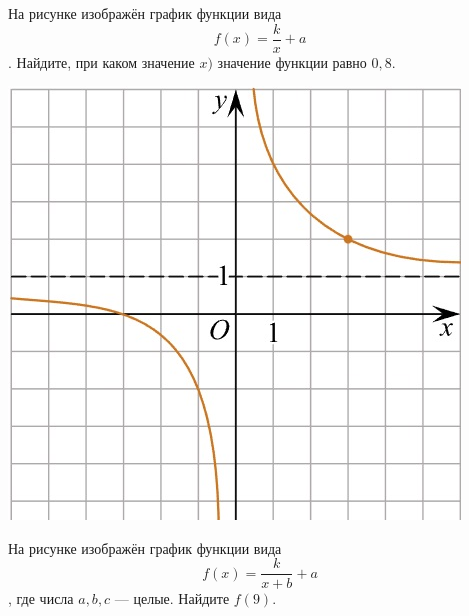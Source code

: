 \begin{class}[number=5]
	\begin{listofex}
		\item
		\begin{minipage}[t]{0.66\textwidth}
			На рисунке изображён график функции вида \[ f(x)=\dfrac{k}{x}+a \]. Найдите, при каком значение \(x)\) значение функции равно \(0,8\).
		\end{minipage}
		\hspace{0.05\textwidth}
		\begin{minipage}[t]{0.22\textwidth}
			\includegraphics[align=t, width=\textwidth]{pics/G101M4C5-1.jpg}
		\end{minipage}
		\item
		\begin{minipage}[t]{0.66\textwidth}
			На рисунке изображён график функции вида \[ f(x)=\dfrac{k}{x+b}+a \], где числа \(a, b, c\) --- целые. Найдите \(f(9)\).
		\end{minipage}
		\hspace{0.05\textwidth}
		\begin{minipage}[t]{0.22\textwidth}

\end{minipage}
\end{listofex}
\end{class}
